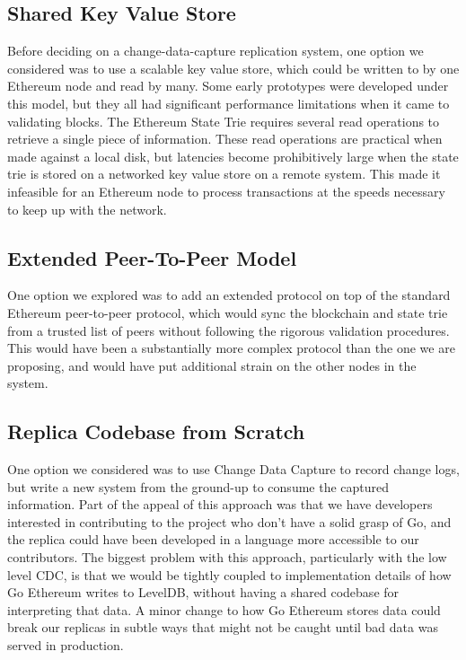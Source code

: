 \documentclass[letterpaper,10pt,english]{sphinxmanual}
\begin{document}
\subsection{Shared Key Value Store}
\label{\detokenize{topics/approach:shared-key-value-store}}
Before deciding on a change-data-capture replication system, one option we
considered was to use a scalable key value store, which could be written to by
one Ethereum node and read by many. Some early prototypes were developed under
this model, but they all had significant performance limitations when it came
to validating blocks. The Ethereum State Trie requires several read operations
to retrieve a single piece of information. These read operations are practical
when made against a local disk, but latencies become prohibitively large when
the state trie is stored on a networked key value store on a remote system.
This made it infeasible for an Ethereum node to process transactions at the
speeds necessary to keep up with the network.


\subsection{Extended Peer-To-Peer Model}
\label{\detokenize{topics/approach:extended-peer-to-peer-model}}
One option we explored was to add an extended protocol on top of the standard
Ethereum peer-to-peer protocol, which would sync the blockchain and state trie
from a trusted list of peers without following the rigorous validation
procedures. This would have been a substantially more complex protocol than the
one we are proposing, and would have put additional strain on the other nodes
in the system.


\subsection{Replica Codebase from Scratch}
\label{\detokenize{topics/approach:replica-codebase-from-scratch}}
One option we considered was to use Change Data Capture to record change logs,
but write a new system from the ground-up to consume the captured information.
Part of the appeal of this approach was that we have developers interested in
contributing to the project who don’t have a solid grasp of Go, and the replica
could have been developed in a language more accessible to our contributors.
The biggest problem with this approach, particularly with the low level CDC, is
that we would be tightly coupled to implementation details of how Go Ethereum
writes to LevelDB, without having a shared codebase for interpreting that data.
A minor change to how Go Ethereum stores data could break our replicas in
subtle ways that might not be caught until bad data was served in production.
\end{document}

